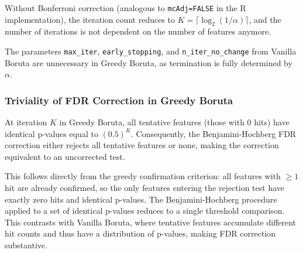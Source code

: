 \documentclass[runningheads]{llncs}
\begin{document}
\noindent Without Bonferroni correction (analogous to \texttt{mcAdj=FALSE} in the R implementation), the iteration count reduces to $K = \lceil \log_2(1/\alpha) \rceil$, and the number of iterations is not dependent on the number of features anymore.

\begin{corollary}
\label{cor:hyperparams}
The parameters \texttt{max\_iter}, \texttt{early\_stopping}, and \texttt{n\_iter\_no\_change} from Vanilla Boruta are unnecessary in Greedy Boruta, as termination is fully determined by $\alpha$.
\end{corollary}

\subsubsection{Triviality of FDR Correction in Greedy Boruta}

\begin{theorem}
\label{thm:fdr_trivial}
At iteration $K$ in Greedy Boruta, all tentative features (those with 0 hits) have identical p-values equal to $(0.5)^K$. Consequently, the Benjamini-Hochberg FDR correction either rejects all tentative features or none, making the correction equivalent to an uncorrected test.
\end{theorem}

This follows directly from the greedy confirmation criterion: all features with $\geq 1$ hit are already confirmed, so the only features entering the rejection test have exactly zero hits and identical p-values. The Benjamini-Hochberg procedure applied to a set of identical p-values reduces to a single threshold comparison. This contrasts with Vanilla Boruta, where tentative features accumulate different hit counts and thus have a distribution of p-values, making FDR correction substantive.


\end{document}
